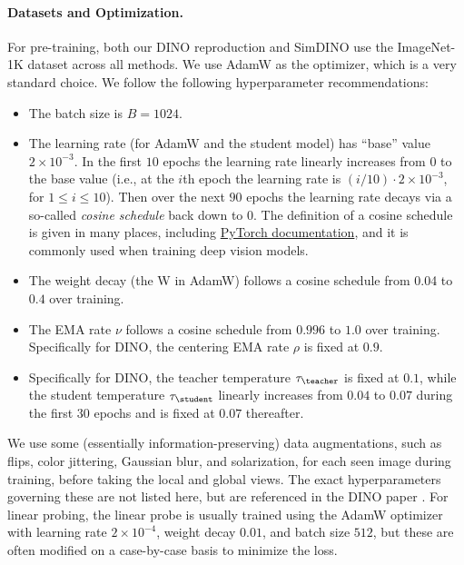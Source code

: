 \documentclass[../../book-main.tex]{subfiles}
\begin{document}
\paragraph{Datasets and Optimization.} For pre-training, both our
DINO reproduction and SimDINO use the ImageNet-1K dataset across all
methods.
We use AdamW \citep{Loshchilov2017DecoupledWD} as the
optimizer, which is a very standard choice.
We follow the following
hyperparameter recommendations:
\begin{itemize}
\item The batch size is \(B = 1024\).
\item The learning rate (for AdamW and the student model) has
    ``base'' value \(2 \times 10^{-3}\).
    In the first \(10\) epochs
    the learning rate linearly increases from \(0\) to the base value
    (i.e., at the \(i\)th epoch the learning rate is \((i/10) \cdot 2
    \times 10^{-3}\), for \(1 \leq i \leq 10\)).
    Then over the next
    \(90\) epochs the learning rate decays via a so-called
    \textit{cosine schedule} back down to \(0\).
    The definition of a
    cosine schedule is given in many places, including
    \href{https://pytorch.org/docs/stable/generated/torch.optim.lr_scheduler.CosineAnnealingLR.html}{PyTorch
    documentation}, and it is commonly used when training deep vision models.
\item The weight decay (the W in AdamW) follows a cosine schedule
    from 0.04 to \(0.4\) over training.
\item The EMA rate \(\nu\) follows a cosine schedule from \(0.996\)
    to \(1.0\) over training.
    Specifically for DINO, the centering
    EMA rate \(\rho\) is fixed at \(0.9\).
\item Specifically for DINO, the teacher temperature
    \(\tau_{\teacher}\) is fixed at \(0.1\), while the student
    temperature \(\tau_{\student}\) linearly increases from \(0.04\)
    to \(0.07\) during the first \(30\) epochs and is fixed at
    \(0.07\) thereafter.
\end{itemize}
We use some (essentially information-preserving) data augmentations,
such as flips, color jittering, Gaussian blur, and solarization, for
each seen image during training, before taking the local and global
views.
The exact hyperparameters governing these are not listed here,
but are referenced in the DINO paper \citep{caron2021emerging}.
For linear probing, the linear probe is usually trained using the
AdamW optimizer with learning rate \(2 \times 10^{-4}\), weight decay
\(0.01\), and batch size \(512\), but these are often modified on a
case-by-case basis to minimize the loss.
\end{document}
